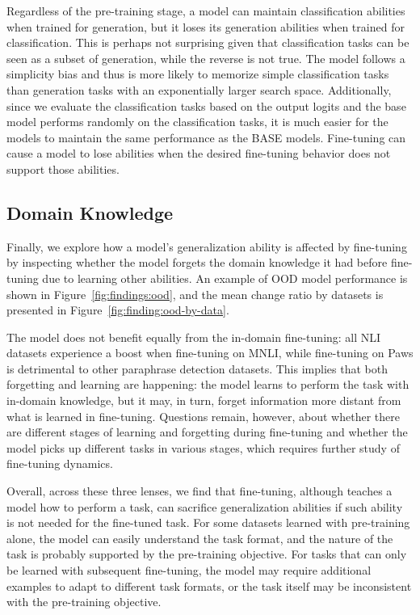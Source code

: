 Regardless of the pre-training stage, a model can maintain classification abilities when trained for generation, but it loses its generation abilities when trained for classification. 
This is perhaps not surprising given that classification tasks can be seen as a subset of generation, while the reverse is not true. 
The model follows a simplicity bias and thus is more likely to memorize simple classification tasks than generation tasks with an exponentially larger search space.
Additionally, since we evaluate the classification tasks based on the output logits and the base model performs randomly on the classification tasks, it is much easier for the models to maintain the same performance as the BASE models. 
Fine-tuning can cause a model to lose abilities when the desired fine-tuning behavior does not support those abilities.



\subsection{Domain Knowledge}
Finally, we explore how a model's generalization ability is affected by fine-tuning by inspecting whether the model forgets the domain knowledge it had before fine-tuning due to learning other abilities.
An example of OOD model performance is shown in Figure~\ref{fig:findings:ood}, and the mean change ratio by datasets is presented in Figure~\ref{fig:finding:ood-by-data}.

The model does not benefit equally from the in-domain fine-tuning: all NLI datasets experience a boost when fine-tuning on MNLI, while fine-tuning on Paws is detrimental to other paraphrase detection datasets.
This implies that both forgetting and learning are happening: the model learns to perform the task with in-domain knowledge, but it may, in turn, forget information more distant from what is learned in fine-tuning.
Questions remain, however, about whether there are different stages of learning and forgetting during fine-tuning and whether the model picks up different tasks in various stages, which requires further study of fine-tuning dynamics.

Overall, across these three lenses, we find that fine-tuning, although teaches a model how to perform a task, can sacrifice generalization abilities if such ability is not needed for the fine-tuned task. 
For some datasets learned with pre-training alone, the model can easily understand the task format, and the nature of the task is probably supported by the pre-training objective. 
For tasks that can only be learned with subsequent fine-tuning, the model may require additional examples to adapt to different task formats, or the task itself may be inconsistent with the pre-training objective.